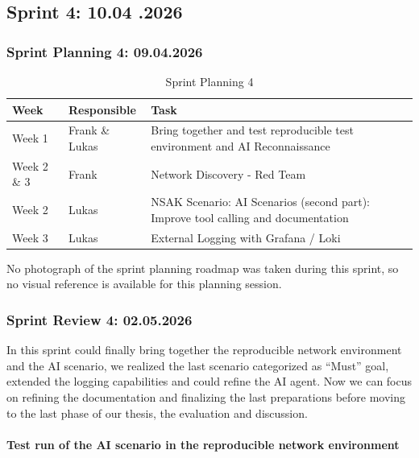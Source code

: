 \subsection{Sprint 4: 10.04 .2026}\label{subsec:sprint-4}

\subsubsection{Sprint Planning 4: 09.04.2026}\label{subsubsec:sprint-planning-4}

\begin{table}[H]
    \centering
    \begin{tabularx}{\textwidth}{l l X}
		\toprule
        \textbf{Week} & \textbf{Responsible} & \textbf{Task} \\
        \midrule
        Week 1 & Frank \& Lukas & Bring together and test reproducible test environment and \gls{AI} Reconnaissance \\
        Week 2 \& 3 & Frank & Network Discovery - Red Team  \\
        Week 2 & Lukas & \gls{NSAK} Scenario: \gls{AI} Scenarios (second part): Improve tool calling and documentation \\
        Week 3 & Lukas & External Logging with Grafana / Loki \\
        \bottomrule
    \end{tabularx}
    \caption{Sprint Planning 4}
    \label{tab:sprint-planning-4}
\end{table}

No photograph of the sprint planning roadmap was taken during this sprint, so no visual reference is available for this planning session.

\subsubsection{Sprint Review 4: 02.05.2026}\label{subsubsec:sprint-review-4}

In this sprint could finally bring together the reproducible network environment and the \gls{AI} scenario,
we realized the last scenario categorized as \enquote{Must} goal,
extended the logging capabilities and could refine the \gls{AI} agent.
Now we can focus on refining the documentation and finalizing the last preparations before moving to the last phase of our thesis, the evaluation and discussion.

\paragraph{Test run of the \gls{AI} scenario in the reproducible network environment}\label{par:test-run-of-ai-scenario-in-the-reproducible-network-environment}

